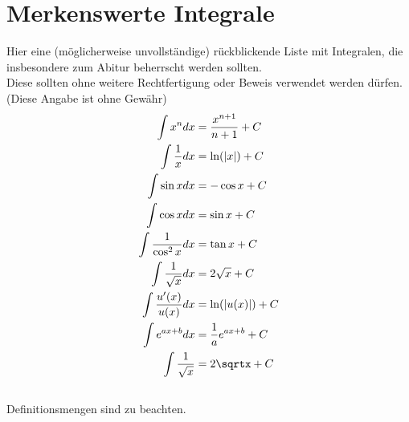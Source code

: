 \section{Merkenswerte Integrale}
Hier eine (möglicherweise unvollständige) rückblickende Liste mit Integralen, die insbesondere zum Abitur beherrscht werden sollten.\\
Diese sollten ohne weitere Rechtfertigung oder Beweis verwendet werden dürfen. (Diese Angabe ist ohne Gewähr)\\
\begin{align*}
  \int x^n dx &=\dfrac{x^{n+1}}{n+1} + C\\
  \int\dfrac{1}{x} dx &= \ln(|x|) + C\\
  \int\sin x dx &= -\cos x + C\\
  \int\cos x dx &= \sin x + C\\
  \int\dfrac{1}{\cos^2x}dx &= \tan x + C\\
  \int\dfrac{1}{\sqrt{x}}dx &= 2\sqrt{x} + C\\
  \int\dfrac{u'(x)}{u(x)} dx &= \ln(|u(x)|) + C\\
  \int e^{ax+b}dx &= \dfrac{1}{a}e^{ax+b} + C\\
  \int \dfrac{1}{\sqrt x} &= 2\sqrtx + C\\
\end{align*}
\\
\danger Definitionsmengen sind zu beachten.
